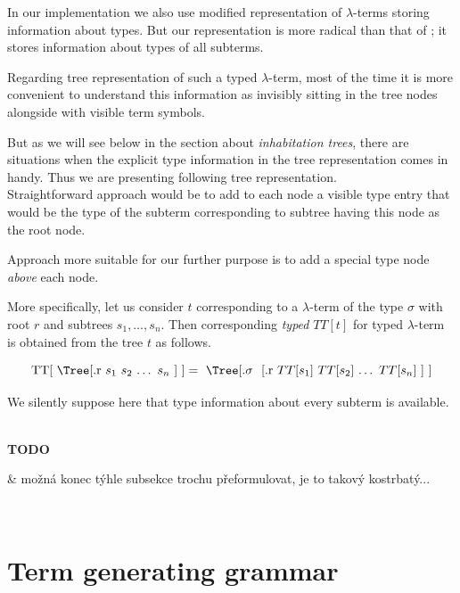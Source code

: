 \documentclass[12pt,a4paper]{report}
\newcommand{\lets}{let us\xspace}
\newcommand{\lterm}{$\lambda$-term\xspace}
\newcommand{\lterms}{$\lambda$-terms\xspace}
\newenvironment{todo}
{ ~\\[0.5em]
  {\color{red}\textbf{TODO}}
  \begin{easylist}[itemize]}
{ \end{easylist}
  ~}
\begin{document}
In our implementation we also use modified representation of \lterms
storing information about types. But our representation is more 
radical than that of \lsChurch; it stores information about types
of all subterms.

Regarding tree representation of such a typed
\lterm, most of the time it is more convenient to 
understand this information as invisibly sitting
in the tree nodes alongside with visible
term symbols.

But as we will see below in the section about \textit{inhabitation trees},
there are situations when the explicit type information in the tree representation
comes in handy. Thus we are presenting following tree representation.\\


Straightforward approach would be to add to each node a visible type entry 
that would be the type of the subterm corresponding to subtree having this
node as the root node. 

Approach more suitable for our further purpose 
is to add a special type node \textit{above} each node.

More specifically,
\lets consider \textit{\sexprTree} $t$ corresponding to a \lterm of the type
$\sigma$ with root $r$ and subtrees $s_1 , \dots , s_n$. 
Then corresponding \textit{typed \sexprTree} $TT[t]$ for typed \lterm is 
obtained from the tree $t$ as follows.  

\begin{equation*}
\mbox{ 
TT[ 
\Tree
	[.r 	
	  	  \text{$s_1$}
		  \text{$s_2$}
		  \text{$\dots$}
		  \text{$s_n$}
	] 
]} =
\mbox{
\Tree
	[.\text{$\sigma$ }
	    [.r 	
	  	  \text{$TT[s_1]$}
		  \text{$TT[s_2]$}
		  \text{$\dots$}
		  \text{$TT[s_n]$}
		]	  	
	] 
}
\end{equation*}

We silently suppose here that type information about every subterm is available.





\begin{todo}
 & možná konec týhle subsekce trochu přeformulovat, je to takový kostrbatý...
\end{todo}

\section{Term generating grammar}
\end{document}
